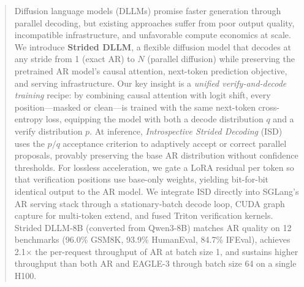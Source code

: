 \documentclass{article} %
\begin{document}
\begin{abstract}
Diffusion language models (DLLMs) promise faster generation through parallel decoding, but existing approaches suffer from poor output quality, incompatible infrastructure, and unfavorable compute economics at scale.
We introduce \textbf{Strided DLLM}, a flexible diffusion model that decodes at any stride from 1 (exact AR) to $N$ (parallel diffusion) while preserving the pretrained AR model's causal attention, next-token prediction objective, and serving infrastructure.
Our key insight is a \emph{unified verify-and-decode training} recipe: by combining causal attention with logit shift, every position---masked or clean---is trained with the same next-token cross-entropy loss, equipping the model with both a decode distribution $q$ and a verify distribution $p$.
At inference, \emph{Introspective Strided Decoding} (ISD) uses the $p/q$ acceptance criterion to adaptively accept or correct parallel proposals, provably preserving the base AR distribution without confidence thresholds.
For lossless acceleration, we gate a LoRA residual per token so that verification positions use base-only weights, yielding bit-for-bit identical output to the AR model.
We integrate ISD directly into SGLang's AR serving stack through a stationary-batch decode loop, CUDA graph capture for multi-token extend, and fused Triton verification kernels.
Strided DLLM-8B (converted from Qwen3-8B) matches AR quality on 12 benchmarks (96.0\% GSM8K, 93.9\% HumanEval, 84.7\% IFEval), achieves 2.1$\times$ the per-request throughput of AR at batch size 1, and sustains higher throughput than both AR and EAGLE-3 through batch size 64 on a single H100.
\end{abstract}














\end{document}
